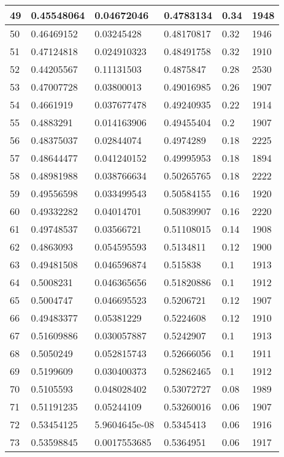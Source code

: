 \begin{longtable}{|l|l|l|l|l|l|}
49 & 0.45548064 & 0.04672046 & 0.4783134 & 0.34 & 1948 \\ \hline 
50 & 0.46469152 & 0.03245428 & 0.48170817 & 0.32 & 1946 \\ \hline 
51 & 0.47124818 & 0.024910323 & 0.48491758 & 0.32 & 1910 \\ \hline 
52 & 0.44205567 & 0.11131503 & 0.4875847 & 0.28 & 2530 \\ \hline 
53 & 0.47007728 & 0.03800013 & 0.49016985 & 0.26 & 1907 \\ \hline 
54 & 0.4661919 & 0.037677478 & 0.49240935 & 0.22 & 1914 \\ \hline 
55 & 0.4883291 & 0.014163906 & 0.49455404 & 0.2 & 1907 \\ \hline 
56 & 0.48375037 & 0.02844074 & 0.4974289 & 0.18 & 2225 \\ \hline 
57 & 0.48644477 & 0.041240152 & 0.49995953 & 0.18 & 1894 \\ \hline 
58 & 0.48981988 & 0.038766634 & 0.50265765 & 0.18 & 2222 \\ \hline 
59 & 0.49556598 & 0.033499543 & 0.50584155 & 0.16 & 1920 \\ \hline 
60 & 0.49332282 & 0.04014701 & 0.50839907 & 0.16 & 2220 \\ \hline 
61 & 0.49748537 & 0.03566721 & 0.51108015 & 0.14 & 1908 \\ \hline 
62 & 0.4863093 & 0.054595593 & 0.5134811 & 0.12 & 1900 \\ \hline 
63 & 0.49481508 & 0.046596874 & 0.515838 & 0.1 & 1913 \\ \hline 
64 & 0.5008231 & 0.046365656 & 0.51820886 & 0.1 & 1912 \\ \hline 
65 & 0.5004747 & 0.046695523 & 0.5206721 & 0.12 & 1907 \\ \hline 
66 & 0.49483377 & 0.05381229 & 0.5224608 & 0.12 & 1910 \\ \hline 
67 & 0.51609886 & 0.030057887 & 0.5242907 & 0.1 & 1913 \\ \hline 
68 & 0.5050249 & 0.052815743 & 0.52666056 & 0.1 & 1911 \\ \hline 
69 & 0.5199609 & 0.030400373 & 0.52862465 & 0.1 & 1912 \\ \hline 
70 & 0.5105593 & 0.048028402 & 0.53072727 & 0.08 & 1989 \\ \hline 
71 & 0.51191235 & 0.05244109 & 0.53260016 & 0.06 & 1907 \\ \hline 
72 & 0.53454125 & 5.9604645e-08 & 0.5345413 & 0.06 & 1916 \\ \hline 
73 & 0.53598845 & 0.0017553685 & 0.5364951 & 0.06 & 1917 \\ \hline 

\end{longtable}
